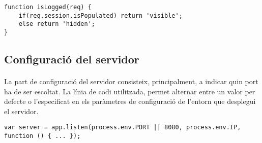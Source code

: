     \begin{lstlisting}[style=rawOwn,caption={Funció per decidir si cal mostrar el botó de desconnexió}]
function isLogged(req) {
    if(req.session.isPopulated) return 'visible';
    else return 'hidden';
}
    \end{lstlisting}


    \subsection{Configuració del servidor}

    \paragraph{}
    La part de configuració del servidor consisteix, principalment, a indicar quin port ha de ser escoltat. La línia de codi utilitzada, permet alternar entre un valor per defecte o l'especificat en els paràmetres de configuració de l'entorn que desplegui el servidor.

    \begin{lstlisting}[style=rawOwn,caption={Configuració del servidor}]
var server = app.listen(process.env.PORT || 8080, process.env.IP, function () { ... });
    \end{lstlisting}
